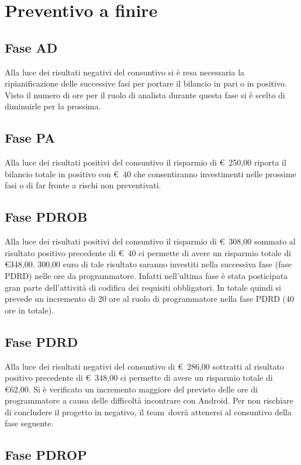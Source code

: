 \documentclass[../PianoProgetto.tex]{subfiles}
\begin{document}
\section{Preventivo a finire}

	\subsection{Fase AD}
		Alla luce dei risultati negativi del consuntivo si è resa necessaria la ripianificazione delle successive fasi per portare il bilancio in pari o in positivo. Visto il numero di ore per il ruolo di analista durante questa fase si è scelto di diminuirle per la prossima.
	
	\subsection{Fase PA}
		Alla luce dei risultati positivi del consuntivo il risparmio di \euro\ 250,00 riporta il bilancio totale in positivo con \euro\ 40 che consentiranno investimenti nelle prossime fasi o di far fronte a rischi non preventivati.
	
	\subsection{Fase PDROB}
		Alla luce dei risultati positivi del consuntivo il risparmio di \euro\ 308,00 sommato al risultato positivo precedente di \euro\ 40 ci permette di avere un risparmio totale di \euro 348,00. 300,00 euro di tale risultato saranno investiti nella successiva fase (fase PDRD) nelle ore da programmatore. Infatti nell'ultima fase è stata posticipata gran parte dell'attività di codifica dei requisiti obbligatori. In totale quindi si prevede un incremento di 20 ore al ruolo di programmatore nella fase PDRD (40 ore in totale).
	
	\subsection{Fase PDRD}
		Alla luce dei risultati negativi del consuntivo di \euro\ 286,00 sottratti al risultato positivo precedente di \euro\ 348,00 ci permette di avere un risparmio totale di \euro 62,00. Si è verificato un incremento maggiore del previsto delle ore di programmatore a causa delle difficoltà incontrare con Android\g. Per non rischiare di concludere il progetto in negativo, il team\g\ dovrà attenersi al consuntivo della fase seguente.
	
	\subsection{Fase PDROP}
		
\end{document}
